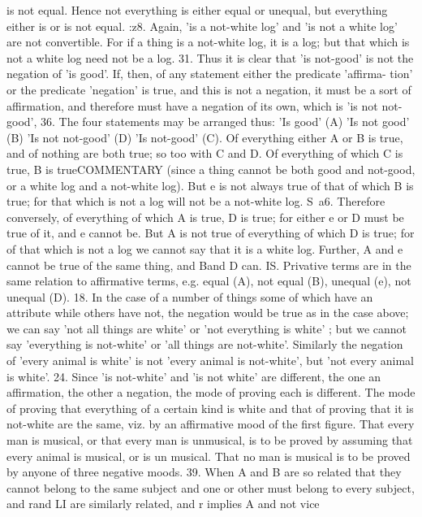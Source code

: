 {{{{{{{{{{{{{{{{{{{{{{{{{{{{{{{{{{{{{{is not equal. Hence not everything is either equal or unequal, but
everything either is or is not equal.
:z8. Again, 'is a not-white log' and 'is not a white log' are not
convertible. For if a thing is a not-white log, it is a log; but that
which is not a white log need not be a log.
31. Thus it is clear that 'is not-good' is not the negation of 'is
good'. If, then, of any statement either the predicate 'affirma-
tion' or the predicate 'negation' is true, and this is not a negation,
it must be a sort of affirmation, and therefore must have a
negation of its own, which is 'is not not-good',
36. The four statements may be arranged thus:
'Is good' (A)
'Is not good' (B)
'Is not not-good' (D)
'Is not-good' (C).
Of everything either A or B is true, and of nothing are both true;
so too with C and D. Of everything of which C is true, B is trueCOMMENTARY
(since a thing cannot be both good and not-good, or a white log
and a not-white log). But e is not always true of that of which B
is true; for that which is not a log will not be a not-white log.
S~a6. Therefore conversely, of everything of which A is true,
D is true; for either e or D must be true of it, and e cannot be.
But A is not true of everything of which D is true; for of that
which is not a log we cannot say that it is a white log. Further,
A and e cannot be true of the same thing, and Band D can.
IS. Privative terms are in the same relation to affirmative
terms, e.g. equal (A), not equal (B), unequal (e), not unequal (D).
18. In the case of a number of things some of which have an
attribute while others have not, the negation would be true as in
the case above; we can say 'not all things are white' or 'not
everything is white' ; but we cannot say 'everything is not-white'
or 'all things are not-white'. Similarly the negation of 'every
animal is white' is not 'every animal is not-white', but 'not every
animal is white'.
24. Since 'is not-white' and 'is not white' are different, the one
an affirmation, the other a negation, the mode of proving each is
different. The mode of proving that everything of a certain kind
is white and that of proving that it is not-white are the same, viz.
by an affirmative mood of the first figure. That every man is
musical, or that every man is unmusical, is to be proved by
assuming that every animal is musical, or is un musical. That no
man is musical is to be proved by anyone of three negative moods.
39. When A and B are so related that they cannot belong to
the same subject and one or other must belong to every subject,
and rand LI are similarly related, and r implies A and not vice
}}}}}}}}}}}}}}}}}}}}}}}}}}}}}}}}}}}}}}
